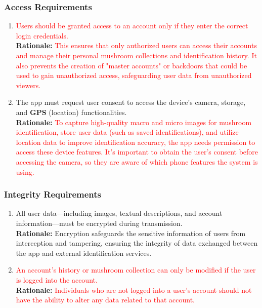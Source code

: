 \documentclass{article}
\begin{document}
\subsubsection{Access Requirements}
\label{ssub:access_requirements}
\begin{enumerate}[{SR-AC}1. ]
	\item \textcolor{red}{Users should be granted access to an account only if they enter the correct login credentials.}\\
	\textbf{Rationale:} \textcolor{red}{This ensures that only authorized users can access their accounts and manage their personal mushroom collections and identification history. It also prevents the creation of "master accounts" or backdoors that could be used to gain unauthorized access, safeguarding user data from unauthorized viewers.}\\
	\item The app must request user consent to access the device's camera, storage, and \textbf{GPS} (location) functionalities.\\
	\textbf{Rationale:} \textcolor{red}{To capture high-quality macro and micro images for mushroom identification, store user data (such as saved identifications), and utilize location data to improve identification accuracy, the app needs permission to access these device features. It's important to obtain the user's consent before accessing the camera, so they are aware of which phone features the system is using.}
\end{enumerate}

\subsubsection{Integrity Requirements}
\label{ssub:integrity_requirements}
\begin{enumerate}[{SR-INT}1. ]
	\item All user data—including images, textual descriptions, and account information—must be encrypted during transmission.\\
	\textbf{Rationale:} Encryption safeguards the sensitive information of users from interception and tampering, ensuring the integrity of data exchanged between the app and external identification services.
	\item \textcolor{red}{An account’s history or mushroom collection can only be modified if the user is logged into the account.}\\
	\textbf{Rationale:} \textcolor{red}{Individuals who are not logged into a user’s account should not have the ability to alter any data related to that account.}\\
\end{enumerate}
\end{document}
